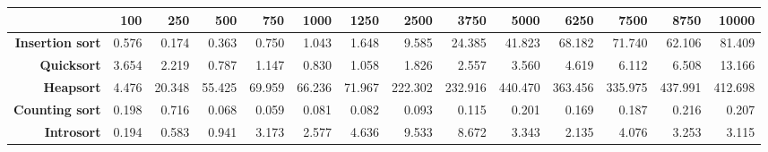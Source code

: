 \begin{tabular}{rrrrrrrrrrrrrr}
\hline
                         &   \textbf{100} &   \textbf{250} &   \textbf{500} &   \textbf{750} &   \textbf{1000} &   \textbf{1250} &   \textbf{2500} &   \textbf{3750} &   \textbf{5000} &   \textbf{6250} &   \textbf{7500} &   \textbf{8750} &   \textbf{10000} \\
\hline
 \textbf{Insertion sort} &          0.576 &          0.174 &          0.363 &          0.750 &           1.043 &           1.648 &           9.585 &          24.385 &          41.823 &          68.182 &          71.740 &          62.106 &           81.409 \\
      \textbf{Quicksort} &          3.654 &          2.219 &          0.787 &          1.147 &           0.830 &           1.058 &           1.826 &           2.557 &           3.560 &           4.619 &           6.112 &           6.508 &           13.166 \\
       \textbf{Heapsort} &          4.476 &         20.348 &         55.425 &         69.959 &          66.236 &          71.967 &         222.302 &         232.916 &         440.470 &         363.456 &         335.975 &         437.991 &          412.698 \\
  \textbf{Counting sort} &          0.198 &          0.716 &          0.068 &          0.059 &           0.081 &           0.082 &           0.093 &           0.115 &           0.201 &           0.169 &           0.187 &           0.216 &            0.207 \\
      \textbf{Introsort} &          0.194 &          0.583 &          0.941 &          3.173 &           2.577 &           4.636 &           9.533 &           8.672 &           3.343 &           2.135 &           4.076 &           3.253 &            3.115 \\
\hline
\end{tabular}